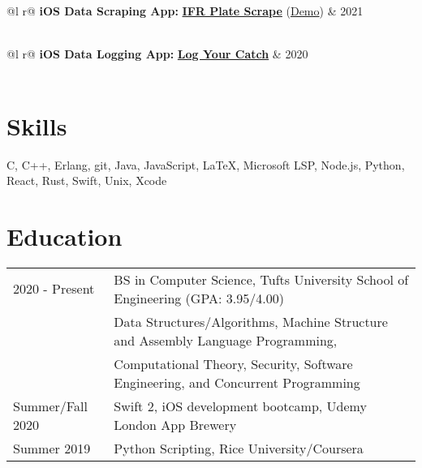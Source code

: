 \documentclass[letter,10pt]{article}
\begin{document}
\begin{tabularx}{\linewidth}{ @{}l r@{} }
    \textbf{iOS Data Scraping App:} \href{https://github.com/liam-strand/IFR-Plate-Scrape}{\textbf{IFR Plate Scrape}} (\href{https://youtu.be/bDe3dsVyUok}{Demo}) & \hfill 2021 \\[3.75pt]
     \\[3.75pt]
\end{tabularx}

\begin{tabularx}{\linewidth}{ @{}l r@{} }
    \textbf{iOS Data Logging App:} \href{https://github.com/bstrand42/Log-Your-Catch}{\textbf{Log Your Catch}} & \hfill 2020 \\[3.75pt]
     \\[3.75pt]
\end{tabularx}

\section{Skills}
\normalsize{C, C++, Erlang, git, Java, JavaScript, \LaTeX, Microsoft LSP, Node.js, Python, React, Rust, Swift, Unix, Xcode}

\section{Education}
\begin{tabularx}{\linewidth}{@{}l X@{}}	
2020 - Present & BS in Computer Science, Tufts University School of Engineering \hfill \normalsize (GPA: 3.95/4.00) \\
    & \footnotesize{Data Structures/Algorithms, Machine Structure and Assembly Language Programming,} \\
    & \footnotesize{Computational Theory, Security, Software Engineering, and Concurrent Programming} \\[3.75pt]
Summer/Fall 2020 & Swift 2, iOS development bootcamp, Udemy London App Brewery \\[3.75pt]
Summer 2019 & Python Scripting, Rice University/Coursera	
\end{tabularx}
\end{document}
